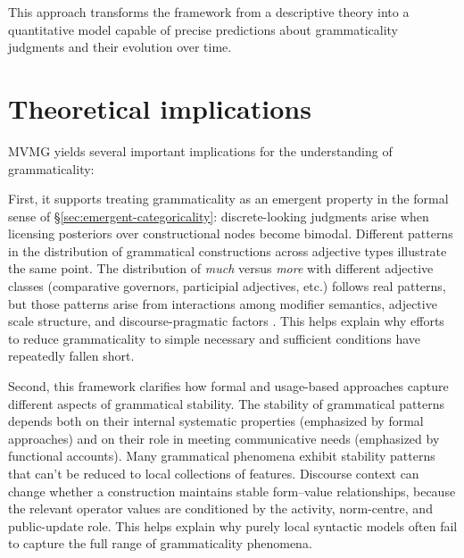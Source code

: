 \documentclass[12pt,letterpaper]{article}
\newcommand{\mention}[1]{\textit{#1}}
\begin{document}
This approach transforms the framework from a descriptive theory into a quantitative model capable of precise predictions about grammaticality judgments and their evolution over time.







\section{Theoretical implications}\label{sec:implications}

MVMG yields several important implications for the understanding of grammaticality:

First, it supports treating grammaticality as an emergent property in the formal sense of \S\ref{sec:emergent-categoricality}: discrete-looking judgments arise when licensing posteriors over constructional nodes become bimodal. Different patterns in the distribution of grammatical constructions across adjective types illustrate the same point. The distribution of \mention{much} versus \mention{more} with different adjective classes (comparative governors, participial adjectives, etc.) follows real patterns, but those patterns arise from interactions among modifier semantics, adjective scale structure, and discourse-pragmatic factors \autocite{reynolds2024why}. This helps explain why efforts to reduce grammaticality to simple necessary and sufficient conditions have repeatedly fallen short.

Second, this framework clarifies how formal and usage-based approaches capture different aspects of grammatical stability. The stability of grammatical patterns depends both on their internal systematic properties (emphasized by formal approaches) and on their role in meeting communicative needs (emphasized by functional accounts). Many grammatical phenomena exhibit stability patterns that can't be reduced to local collections of features. Discourse context can change whether a construction maintains stable form--value relationships, because the relevant operator values are conditioned by the activity, norm-centre, and public-update role. This helps explain why purely local syntactic models often fail to capture the full range of grammaticality phenomena.
\end{document}
